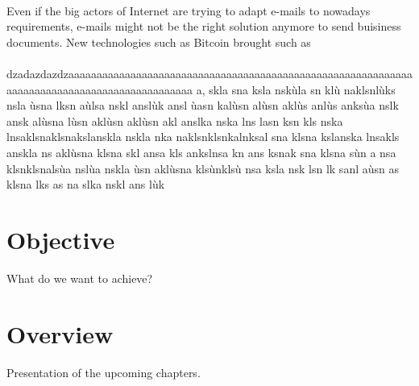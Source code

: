 \paragraph{}
 Even if the big actors of Internet are trying to adapt e-mails to nowadays requirements, e-mails might not be the right solution anymore to send buisiness documents. New technologies such as Bitcoin brought such as 
\paragraph{}
dzadazdazdzaaaaaaaaaaaaaaaaaaaaaaaaaaaaaaaaaaaaaaaaaaaaaaaaaaaaaaaaaaaaaaaaaaaaaaaaaaaaaaaaaaaaaaaaaaaaaa a,	skla	sna	ksla	nskùla	sn	klù	naklsnlùks	nsla	ùsna	lksn	aùlsa	nskl	anslùk	ansl	ùasn	kalùsn	alùsn	aklùs	anlùs	anksùa	nslk	ansk	alùsna	lùsn	aklùsn	aklùsn	akl	anslka	nska	lns	lasn	ksn	kls	nska	lnsaklsnaklsnakslanskla	nskla	 nka	naklsnklsnkalnksal	sna	klsna	kslanska	lnsakls	anskla	ns	aklùsna	klsna	skl	ansa	kls	ankslnsa	kn ans	ksnak	sna	klsna	sùn	a nsa	klsnklsnalsùa	nslùa	nskla	ùsn	aklùsna	klsùnklsù	nsa	ksla	nsk	lsn lk	sanl	aùsn as	klsna	lks	as na	slka	nskl	ans	lùk

\section{Objective}

What do we want to achieve?

\section{Overview}

Presentation of the upcoming chapters.